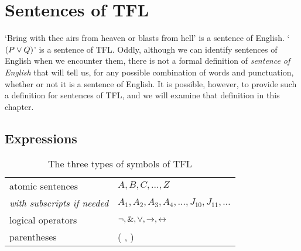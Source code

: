 







\chapter{Sentences of TFL}\label{s:TFLSentences}

`Bring with thee airs from heaven or blasts from hell' is a sentence of English. `$(P \vee Q)$' is a sentence of TFL. Oddly, although we can identify sentences of English when we encounter them, there is not a formal definition of \textit{sentence of English} that will tell us, for any possible combination of words and punctuation, whether or not it is a sentence of English. It is possible, however, to provide such a definition for sentences of TFL, and we will examine that definition in this chapter. 

\section{Expressions}

\begin{table*}\centering\sffamily\footnotesize
{}
\begin{tabular}{@{}l l@{}}\toprule
atomic sentences & $A,B,C,\ldots,Z$\\
\enspace \textit{with subscripts if needed} & $A_1, A_2, A_3,A_4, \ldots, J_{10}, J_{11}, \ldots$\\
logical operators & ${\neg},\mathbin{\&},\vee,\rightarrow,\leftrightarrow$\\
parentheses &( , )\\
\bottomrule
\end{tabular}
\caption{The three types of symbols of TFL}\label{table.symbols-TFL}
\label{TFL-symbols}
\end{table*}

